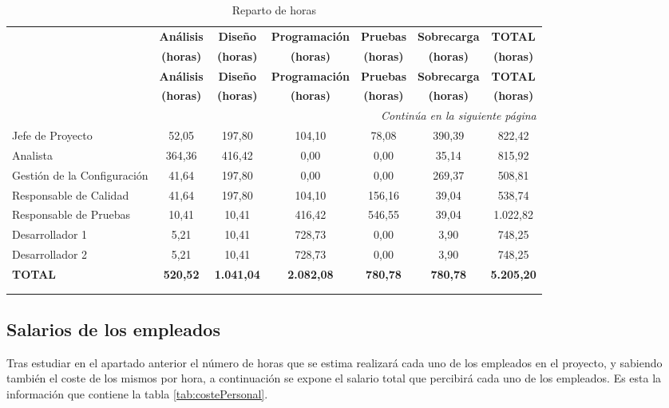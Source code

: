 \documentclass[10pt,a4paper,oldfontcommands]{plantillaDPDS}
\begin{document}
\begin{center}
\begin{longtable}{lcccccc}

& \textbf{Análisis}	&	\textbf{Diseño}	&	\textbf{Programación}	&	\textbf{Pruebas}	&	\textbf{Sobrecarga}	&	\textbf{TOTAL} \\
& \textbf{(horas)}	&	\textbf{(horas)}	&	\textbf{(horas)}	&	\textbf{(horas)}	&	\textbf{(horas)}	&	\textbf{(horas)} \\
\hline
\hline
\endfirsthead
& \textbf{Análisis}	&	\textbf{Diseño}	&	\textbf{Programación}	&	\textbf{Pruebas}	&	\textbf{Sobrecarga}	&	\textbf{TOTAL} \\
& \textbf{(horas)}	&	\textbf{(horas)}	&	\textbf{(horas)}	&	\textbf{(horas)}	&	\textbf{(horas)}	&	\textbf{(horas)} \\
\hline
\hline
\endhead

\hline \multicolumn{7}{r}{\textit{Continúa en la siguiente página}} \\
\endfoot
\endlastfoot

Jefe de Proyecto	&	52,05	&	197,80	&	104,10	&	78,08	&	390,39	&	822,42	\\
Analista	&	364,36	&	416,42	&	0,00	&	0,00	&	35,14	&	815,92	\\
Gestión de la Configuración	&	41,64	&	197,80	&	0,00	&	0,00	&	269,37	&	508,81	\\
Responsable de Calidad	&	41,64	&	197,80	&	104,10	&	156,16	&	39,04	&	538,74	\\
Responsable de Pruebas	&	10,41	&	10,41	&	416,42	&	546,55	&	39,04	&	1.022,82	\\
Desarrollador 1 &	5,21	&	10,41	&	728,73	&	0,00	&	3,90	&	748,25	\\
Desarrollador 2	&	5,21	&	10,41	&	728,73	&	0,00	&	3,90	&	748,25	\\	\hline \hline
\textbf{TOTAL}	&	\textbf{520,52}	&	\textbf{1.041,04}	&	\textbf{2.082,08}	&	\textbf{780,78}	&\textbf{780,78}	&	\textbf{5.205,20}	\\	\hline

\caption{Reparto de horas}\\
\label{tab:repHoras}
\end{longtable}
\end{center}




\subsection{Salarios de los empleados}
\par Tras estudiar en el apartado anterior el número de horas que se estima realizará cada uno de los empleados en el proyecto, y sabiendo también el coste de los mismos por hora, a continuación se expone el salario total que percibirá cada uno de los empleados. Es esta la información que contiene la tabla \ref{tab:costePersonal}.
\end{document}
